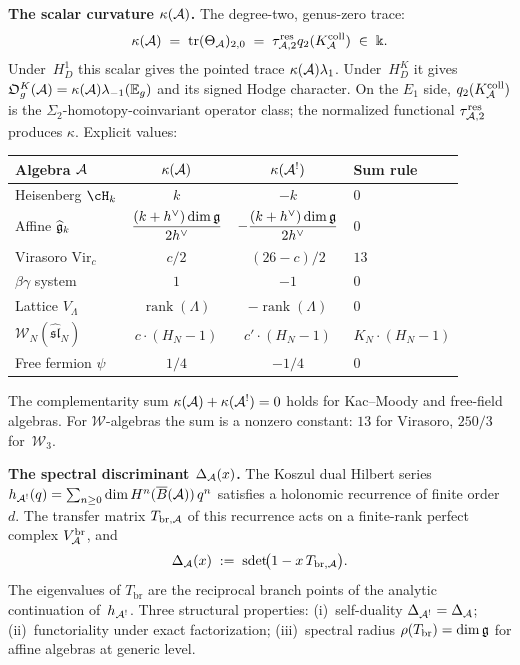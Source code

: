 \noindent\textbf{The scalar curvature $\kappa(\mathcal{A})$.}\enspace
The degree-two, genus-zero trace:
\[
\kappa(\mathcal{A})
\;=\;
\operatorname{tr}(\Theta_{\mathcal{A}})_{2,0}
\;=\;
\tau_{\mathcal{A},2}^{\mathrm{res}}q_2(K_{\mathcal{A}}^{\mathrm{coll}})
\;\in\;\Bbbk.
\]
Under~$H_D^1$ this scalar gives the pointed trace
$\kappa(\mathcal{A})\lambda_1$.  Under~$H_D^K$ it gives
$\mathfrak O_g^K(\mathcal{A})=\kappa(\mathcal{A})\lambda_{-1}(\mathbb E_g)$ and its
signed Hodge character. On
the $E_1$ side, $q_2(K_{\mathcal{A}}^{\mathrm{coll}})$ is the
$\Sigma_2$-homotopy-coinvariant operator class; the normalized
functional $\tau_{\mathcal{A},2}^{\mathrm{res}}$ produces $\kappa$. Explicit values:
\begin{center}
\renewcommand{\arraystretch}{1.2}
\begin{tabular}{lccl}
\textbf{Algebra $\mathcal{A}$}
 & $\kappa(\mathcal{A})$
 & $\kappa(\mathcal{A}^!)$
 & \textbf{Sum rule}\\
\hline
Heisenberg $\cH_k$ & $k$ & $-k$ & $0$\\[2pt]
Affine $\widehat{\mathfrak{g}}_k$
 & $\dfrac{(k+h^\vee)\dim\mathfrak{g}}{2h^\vee}$
 & $-\dfrac{(k+h^\vee)\dim\mathfrak{g}}{2h^\vee}$ & $0$\\[6pt]
Virasoro $\mathrm{Vir}_c$ & $c/2$ & $(26-c)/2$ & $13$\\[2pt]
$\beta\gamma$ system & $1$ & $-1$ & $0$\\[2pt]
Lattice $V_\Lambda$ & $\operatorname{rank}(\Lambda)$
 & $-\operatorname{rank}(\Lambda)$ & $0$\\[2pt]
$\mathcal W_N(\widehat{\mathfrak{sl}}_N)$
 & $c\cdot(H_N{-}1)$
 & $c'\cdot(H_N{-}1)$
 & $K_N\cdot(H_N{-}1)$\\[6pt]
Free fermion $\psi$ & $1/4$ & $-1/4$ & $0$
\end{tabular}
\end{center}
The complementarity sum $\kappa(\mathcal{A})+\kappa(\mathcal{A}^!)=0$ holds for
Kac--Moody and free-field algebras. For $\mathcal W$-algebras the
sum is a nonzero constant: $13$ for Virasoro, $250/3$
for~$\mathcal W_3$.

\medskip

\noindent\textbf{The spectral discriminant $\Delta_{\mathcal{A}}(x)$.}\enspace
The Koszul dual Hilbert series
$h_{\mathcal{A}^!}(q)=\sum_{n\ge 0}\dim H^n(\overline{B}(\mathcal{A}))\,q^n$ satisfies a
holonomic recurrence of finite order~$d$. The transfer matrix
$T_{\mathrm{br},\mathcal{A}}$ of this recurrence acts on a
finite-rank perfect complex $V^{\mathrm{br}}_{\mathcal{A}}$, and
\[
\Delta_{\mathcal{A}}(x)
\;:=\;
\operatorname{sdet}\!\bigl(1-x\,T_{\mathrm{br},\mathcal{A}}\bigr).
\]
The eigenvalues of $T_{\mathrm{br}}$ are the reciprocal branch
points of the analytic continuation of~$h_{\mathcal{A}^!}$. Three
structural properties: (i)~self-duality
$\Delta_{\mathcal{A}^!}=\Delta_{\mathcal{A}}$; (ii)~functoriality under exact
factorization; (iii)~spectral radius
$\rho(T_{\mathrm{br}})=\dim\mathfrak{g}$ for affine algebras at
generic level.


